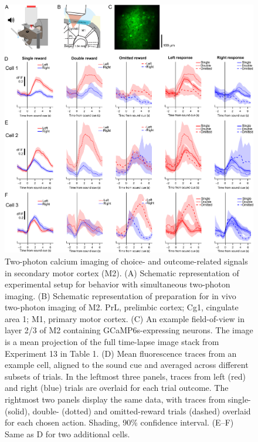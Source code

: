 \begin{figure}[htbp]

\begin{center}
\includegraphics[width=\textwidth]{Figures/CC_fig3.png} 
\end{center}

\caption[Two-photon Ca\textsuperscript{2+} imaging of choice- and outcome-related signals]
{Two-photon calcium imaging of choice- and outcome-related signals in secondary motor cortex (M2). (A) Schematic representation of experimental setup for behavior with simultaneous two-photon imaging. (B) Schematic representation of preparation for in vivo two-photon imaging of M2. PrL, prelimbic cortex; Cg1, cingulate area 1; M1, primary motor cortex. (C) An example field-of-view in layer 2/3 of M2 containing GCaMP6s-expressing neurons. The image is a mean projection of the full time-lapse image stack from Experiment 13 in Table 1. (D) Mean fluorescence traces from an example cell, aligned to the sound cue and averaged across different subsets of trials. In the leftmost three panels, traces from left (red) and right (blue) trials are overlaid for each trial outcome. The rightmost two panels display the same data, with traces from single- (solid), double- (dotted) and omitted-reward trials (dashed) overlaid for each chosen action. Shading, 90\% confidence interval. (E–F) Same as D for two additional cells.}

\label{fig:CC_fig3}
\end{figure}